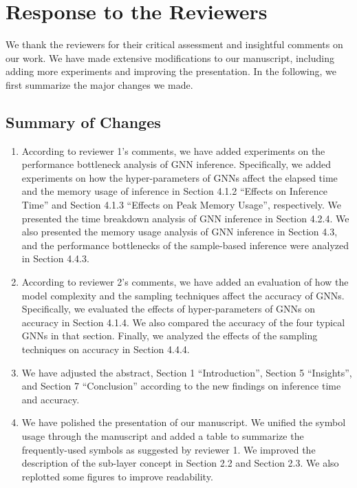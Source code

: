 \documentclass[12pt]{article}
\newcounter{reviewer}
\newcounter{point}[reviewer]
\begin{document}
\section*{Response to the Reviewers}
We thank the reviewers for their critical assessment and insightful comments on our work.
%
We have made extensive modifications to our manuscript, including adding more experiments and improving the presentation.
%
In the following, we first summarize the major changes we made.
%
%

\subsection*{Summary of Changes}

\begin{enumerate}
\item According to reviewer 1's comments, we have added experiments on the performance bottleneck analysis of GNN inference.
%
Specifically, we added experiments on how the hyper-parameters of GNNs affect the elapsed time and the memory usage of inference in Section 4.1.2 ``Effects on Inference Time'' and Section 4.1.3 ``Effects on Peak Memory Usage'', respectively.
%
We presented the time breakdown analysis of GNN inference in Section 4.2.4.
%
We also presented the memory usage analysis of GNN inference in Section 4.3, and the performance bottlenecks of the sample-based inference were analyzed in Section 4.4.3.

\item According to reviewer 2's comments, we have added an evaluation of how the model complexity and the sampling techniques affect the accuracy of GNNs.
%
Specifically, we evaluated the effects of hyper-parameters of GNNs on accuracy in Section 4.1.4.
%
We also compared the accuracy of the four typical GNNs in that section.
%
Finally, we analyzed the effects of the sampling techniques on accuracy in Section 4.4.4.

\item We have adjusted the abstract, Section 1 ``Introduction'', Section 5 ``Insights'', and Section 7 ``Conclusion'' according to the new findings on inference time and accuracy.

\item We have polished the presentation of our manuscript.
%
We unified the symbol usage through the manuscript and added a table to summarize the frequently-used symbols as suggested by reviewer 1.
%
We improved the description of the sub-layer concept in Section 2.2 and Section 2.3.
%
We also replotted some figures to improve readability.


\end{enumerate}
\end{document}
